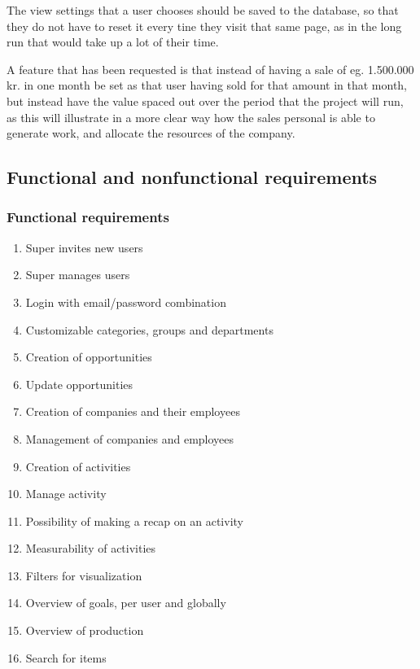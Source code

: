 The view settings that a user chooses should be saved to the database, so that they do not have to reset it every tine they visit that same page, as in the long run that would take up a lot of their time.

A feature that has been requested is that instead of having a sale of eg. 1.500.000 kr. in one month be set as that user having sold for that amount in that month, but instead have the value spaced out over the period that the project will run, as this will illustrate in a more clear way how the sales personal is able to generate work, and allocate the resources of the company.

\subsection{Functional and nonfunctional requirements}
\label{sub:Functional and nonfunctional requirements}

\subsubsection{Functional requirements}
\label{subs:Functional requirements}
\begin{enumerate}[label=\textbf{F\arabic*}]
  \item Super invites new users
  \item Super manages users
  \item Login with email/password combination
  \item Customizable categories, groups and departments
  \item Creation of opportunities
  \item Update opportunities
  \item Creation of companies and their employees
  \item Management of companies and employees
  \item Creation of activities
  \item Manage activity
  \item Possibility of making a recap on an activity
  \item Measurability of activities
  \item Filters for visualization
  \item Overview of goals, per user and globally
  \item Overview of production
  \item Search for items
\end{enumerate}

